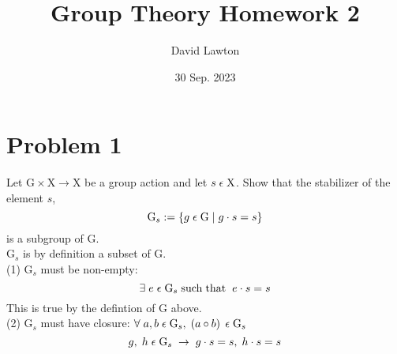 \documentclass[11pt,oneside,a4paper]{article}
\begin{document}
\title{Group Theory Homework 2}
\author{David Lawton}
\date{30 Sep. 2023}
\maketitle
\vfill
\tableofcontents
\clearpage

\section{Problem 1}
Let $\mathrm{G} \times \mathrm{X} \rightarrow \mathrm{X} $ be a group action and let $s \hspace{1mm} \epsilon \hspace{1mm} \mathrm{X}$. Show that the stabilizer of the element $s$, $$ \mathrm{G}_s := \{ g \hspace{1mm} \epsilon \hspace{1mm} \mathrm{G} \hspace{1mm} | \hspace{1mm} g \cdot s = s \} $$ is a subgroup of G. \vspace{10pt} \\
\noindent $ \mathrm{G}_s $ is by definition a subset of G. \vspace{5pt} \\
\indent (1) $ \mathrm{G}_s $ must be non-empty:
$$\exists \hspace{1mm} e \hspace{1mm} \epsilon \hspace{1mm} \mathrm{G}_s \hspace{1mm}  \mathrm{such \hspace{1mm} that} \hspace{2mm} e \cdot s = s$$  \indent \indent This is true by the defintion of G above. \vspace{4pt} \\
\indent (2) $ \mathrm{G}_s $ must have closure: $ \forall \hspace{1mm} a, b \hspace{1mm} \epsilon \hspace{1mm}  \mathrm{G}_s \mathrm{,} \hspace{1mm}   \left( a \circ b \right)  \hspace{1mm}  \epsilon \hspace{1mm}  \mathrm{G}_s  $ 
$$ g, \hspace{1mm} h \hspace{1mm} \epsilon \hspace{1mm} \mathrm{G}_s \hspace{1mm} \rightarrow \hspace{1mm} g   \cdot s = s , \hspace{1mm} h \cdot s = s $$ 
\end{document}
